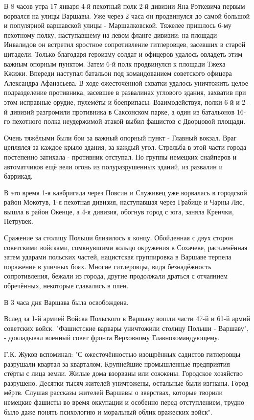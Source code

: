В 8 часов утра 17 января 4-й пехотный полк 2-й дивизии Яна Роткевича первым
ворвался на улицы Варшавы. Уже через 2 часа он продвинулся до самой большой и
популярной варшавской улицы - Маршалковской. Тяжелее пришлось 6-му пехотному
полку, наступавшему на левом фланге дивизии: на площади Инвалидов он встретил
яростное сопротивление гитлеровцев, засевших в старой цитадели. Только
благодаря героизму солдат и офицеров удалось овладеть этим важным опорным
пунктом. Затем 6-й полк продвинулся к площади Тжеха Кжижи. Впереди наступал
батальон под командованием советского офицера Александра Афанасьева. В ходе
ожесточённой схватки удалось уничтожить целое подразделение противника,
засевшее в развалинах углового здания, захватив при этом исправные орудие,
пулемёты и боеприпасы. Взаимодействуя, полки 6-й и 2-й дивизий разгромили
противника в Саксонском парке, а один из батальонов 16-го пехотного полка
неудержимой атакой выбил фашистов с Дворцовой площади. 

Очень тяжёлыми были бои за важный опорный пункт - Главный вокзал. Враг цеплялся
за каждое крыло здания, за каждый угол. Стрельба в этой части города постепенно
затихала - противник отступал. Но группы немецких снайперов и автоматчиков ещё
вели огонь из полуразрушенных зданий, из развалин и баррикад. 

В это время 1-я кавбригада через Повсин и Служивец уже ворвалась в городской
район Мокотув, 1-я пехотная дивизия, наступавшая через Грабице и Чарны Ляс,
вышла в район Окенце, а 4-я дивизия, обогнув город с юга, заняла Кренчки,
Петрувек. 

Сражение за столицу Польши близилось к концу. Обойденная с двух сторон
советскими войсками, сомкнувшими кольцо окружения в Сохачеве, расчленённая
затем ударами польских частей, нацистская группировка в Варшаве терпела
поражение в уличных боях. Многие гитлеровцы, видя безнадёжность сопротивления,
бежали из города, другие продолжали драться с отчаянием обречённых, некоторые
сдавались в плен. 

В 3 часа дня Варшава была освобождена. 

Вслед за 1-й армией Войска Польского в Варшаву вошли части 47-й и 61-й армий
советских войск.  "Фашистские варвары уничтожили столицу Польши - Варшаву", -
докладывал военный совет фронта Верховному Главнокомандующему. 

Г.К. Жуков вспоминал: "С ожесточённостью изощрённых садистов гитлеровцы
разрушали квартал за кварталом. Крупнейшие промышленные предприятия стёрты с
лица земли. Жилые дома взорваны или сожжены. Городское хозяйство разрушено.
Десятки тысяч жителей уничтожены, остальные были изгнаны. Город мёртв. Слушая
рассказы жителей Варшавы о зверствах, которые творили немецкие фашисты во время
оккупации и особенно перед отступлением, трудно было даже понять психологию и
моральный облик вражеских войск". 

